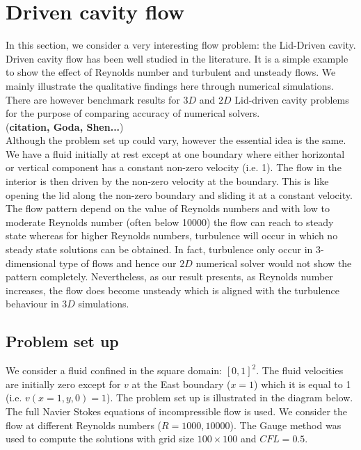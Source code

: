 \newpage
\section{Driven cavity flow}
In this section, we consider a very interesting flow problem: the Lid-Driven cavity. Driven cavity flow has been well studied in the literature. It is a simple example to show the effect of Reynolds number and turbulent and unsteady flows. We mainly illustrate the qualitative findings here through numerical simulations. There are however benchmark results for $3D$ and $2D$ Lid-driven cavity problems for the purpose of comparing accuracy of numerical solvers.\\ (\textbf{citation, Goda, Shen...})\\

Although the problem set up could vary, however the essential idea is the same. We have a fluid initially at rest except at one boundary where either horizontal or vertical component has a constant non-zero velocity (i.e. 1). The flow in the interior is then driven by the non-zero velocity at the boundary. This is like opening the lid along the non-zero boundary and sliding it at a constant velocity. The flow pattern depend on the value of Reynolds numbers and with low to moderate Reynolds number (often below 10000) the flow can reach to steady state whereas for higher Reynolds numbers, turbulence will occur in which no steady state solutions can be obtained. In fact, turbulence only occur in 3-dimensional type of flows and hence our $2D$ numerical solver would not show the pattern completely. Nevertheless, as our result presents, as Reynolds number increases, the flow does become unsteady which is aligned with the turbulence behaviour in $3D$ simulations.

\subsection{Problem set up}
We consider a fluid confined in the square domain: $[0,1]^2$. The fluid velocities are initially zero except for $v$ at the East boundary ($x=1$) which it is equal to 1 (i.e. $v(x=1,y,0)=1$). The problem set up is illustrated in the diagram below. The full Navier Stokes equations of incompressible flow is used. We consider the flow at different Reynolds numbers ($R = 1000, 10000$). The Gauge method was used to compute the solutions with grid size $100 \times 100$ and $CFL = 0.5$. \\


